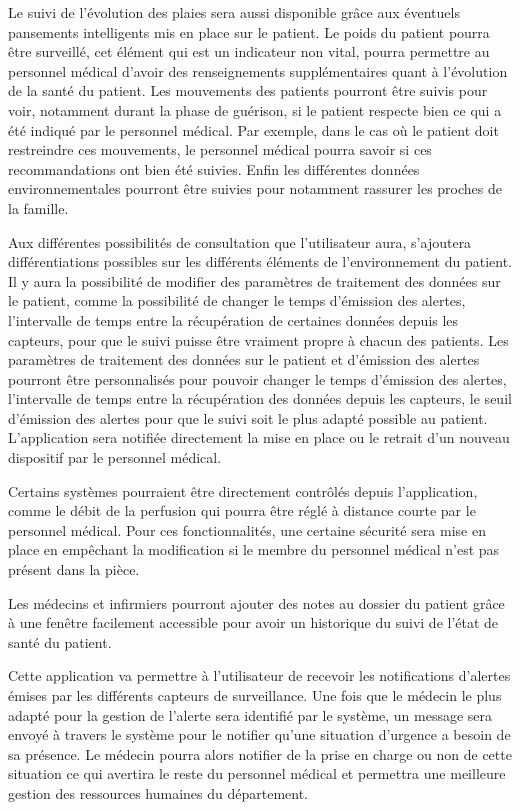 Le suivi de l’évolution des plaies sera aussi disponible grâce aux éventuels pansements intelligents mis en place sur le patient.
Le poids du patient pourra être surveillé, cet élément qui est un indicateur non vital, pourra permettre au personnel médical
d’avoir des renseignements supplémentaires quant à l’évolution de la santé du patient. Les mouvements des patients pourront être
suivis pour voir, notamment durant la phase de guérison, si le patient respecte bien ce qui a été indiqué par le personnel
médical. Par exemple, dans le cas où le patient doit restreindre ces mouvements, le personnel médical pourra savoir si ces
recommandations ont bien été suivies. Enfin les différentes données environnementales pourront être suivies pour notamment rassurer
les proches de la famille.

Aux différentes possibilités de consultation que l’utilisateur aura, s’ajoutera différentiations possibles sur les différents
éléments de l’environnement du patient. Il y aura la possibilité de modifier des paramètres de traitement des données sur le
patient, comme la possibilité de changer le temps d’émission des alertes, l’intervalle de temps entre la récupération de certaines
données depuis les capteurs, pour que le suivi puisse être vraiment propre à chacun des patients. Les paramètres de
traitement des données sur le patient et d’émission des alertes pourront être personnalisés pour pouvoir changer le temps
d’émission des alertes, l’intervalle de temps entre la récupération des données depuis les capteurs, le seuil d’émission des
alertes pour que le suivi soit le plus adapté possible au patient. L’application sera notifiée directement la mise en place ou le
retrait d’un nouveau dispositif par le personnel médical. 

Certains systèmes pourraient être directement contrôlés depuis l’application, comme le débit de la perfusion qui pourra être réglé à distance courte par le personnel médical. Pour ces fonctionnalités, une certaine sécurité sera mise en place en empêchant la modification si le membre du personnel médical n’est pas présent dans la pièce.

Les médecins et infirmiers pourront ajouter des notes au dossier du patient grâce à une fenêtre facilement accessible pour avoir un historique du suivi de l’état de santé du patient.

Cette application va permettre à l’utilisateur de recevoir les notifications d’alertes émises par les différents capteurs de
surveillance. Une fois que le médecin le plus adapté pour la gestion de l’alerte sera identifié par le système, un message sera
envoyé à travers le système pour le notifier  qu’une situation d’urgence a besoin de sa présence. Le médecin pourra alors notifier
de la prise en charge ou non de cette situation ce qui avertira le reste du personnel médical et permettra une meilleure gestion des ressources humaines du département.
